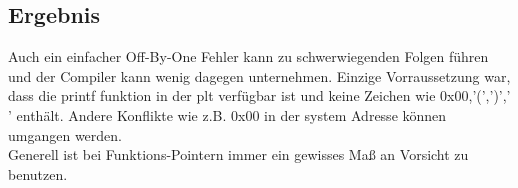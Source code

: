\subsection{Ergebnis}
Auch ein einfacher Off-By-One Fehler kann zu schwerwiegenden Folgen führen und der Compiler kann wenig dagegen unternehmen. 
Einzige Vorraussetzung war, dass die printf funktion in der plt verfügbar ist und keine Zeichen wie 0x00,'(',')',' ' enthält. Andere Konflikte wie z.B. 0x00 in der system Adresse können umgangen werden. \\
Generell ist bei Funktions-Pointern immer ein gewisses Maß an Vorsicht zu benutzen.



